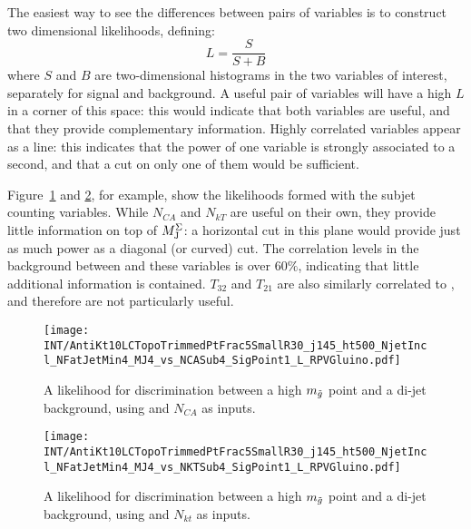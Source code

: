 The easiest way to see the differences between pairs of variables is to construct two dimensional likelihoods, defining:
%
\begin{equation}
L = \frac{S}{S+B}
\end{equation}
%
where $S$ and $B$ are two-dimensional histograms in the two variables of interest, separately for signal and background. A useful pair of variables will have a high $L$ in a corner of this space: this would indicate that both variables are useful, and that they provide complementary information. Highly correlated variables appear as a line: this indicates that the power of one variable is strongly associated to a second, and that a cut on only one of them would be sufficient. 

Figure~\ref{fig:search:search:optimization:2D:NCA} and \ref{fig:search:search:optimization:2D:NKT}, for example, show the likelihoods formed with the subjet counting variables. While $N_{CA}$ and $N_{kT}$ are useful on their own, they provide little information on top of $M_{\textrm{J}}^{\Sigma}$: a horizontal cut in this plane would provide just as much power as a diagonal (or curved) cut. The correlation levels in the background between \MJ and these variables is over $60\%$, indicating that little additional information is contained. $T_{32}$ and $T_{21}$ are also similarly correlated to \MJ, and therefore are not particularly useful.



\begin{figure}
\centering
\texttt{[image: INT/AntiKt10LCTopoTrimmedPtFrac5SmallR30\_j145\_ht500\_NjetIncl\_NFatJetMin4\_MJ4\_vs\_NCASub4\_SigPoint1\_L\_RPVGluino.pdf]}
\caption{A likelihood for discrimination between a high $m_{\tilde{g}}$ point and a \herwigpp di-jet background, using \MJ and $N_{CA}$ as inputs.}
\label{fig:search:search:optimization:2D:NCA}
\end{figure}




\begin{figure}
\centering
\texttt{[image: INT/AntiKt10LCTopoTrimmedPtFrac5SmallR30\_j145\_ht500\_NjetIncl\_NFatJetMin4\_MJ4\_vs\_NKTSub4\_SigPoint1\_L\_RPVGluino.pdf]}
\caption{A likelihood for discrimination between a high $m_{\tilde{g}}$ point and a \herwigpp di-jet background, using \MJ and $N_{kt}$ as inputs.}
\label{fig:search:search:optimization:2D:NKT}
\end{figure}

